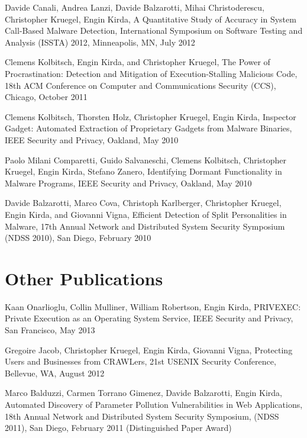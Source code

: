 \documentclass[letterpaper,11pt]{scrartcl}
\begin{document}
\vspace*{1em}
\noindent Davide Canali, Andrea Lanzi, Davide Balzarotti, Mihai Christoderescu,
Christopher Kruegel, Engin Kirda, A Quantitative Study of Accuracy in
System Call-Based Malware Detection, International Symposium on
Software Testing and Analysis (ISSTA) 2012, Minneapolis, MN, July 2012

\vspace*{1em}
\noindent Clemens Kolbitsch, Engin Kirda, and Christopher Kruegel, The Power of
Procrastination: Detection and Mitigation of Execution-Stalling
Malicious Code, 18th ACM Conference on Computer and Communications
Security (CCS), Chicago, October 2011

\vspace*{1em}
\noindent Clemens Kolbitsch, Thorsten Holz, Christopher Kruegel, Engin Kirda,
Inspector Gadget: Automated Extraction of Proprietary Gadgets from
Malware Binaries, IEEE Security and Privacy, Oakland, May 2010

\vspace*{1em}
\noindent Paolo Milani Comparetti, Guido Salvaneschi, Clemens Kolbitsch,
Christopher Kruegel, Engin Kirda, Stefano Zanero, Identifying Dormant
Functionality in Malware Programs, IEEE Security and Privacy, Oakland,
May 2010

\vspace*{1em}
\noindent Davide Balzarotti, Marco Cova, Christoph Karlberger, Christopher
Kruegel, Engin Kirda, and Giovanni Vigna, Efficient Detection of Split
Personalities in Malware, 17th Annual Network and Distributed System
Security Symposium (NDSS 2010), San Diego, February 2010

\section*{Other Publications}

\vspace*{1em}
\noindent Kaan Onarlioglu, Collin Mulliner, William Robertson, Engin
Kirda, PRIVEXEC: Private Execution as an Operating System Service,
IEEE Security and Privacy, San Francisco, May 2013

\vspace*{1em}
\noindent Gregoire Jacob, Christopher Kruegel, Engin Kirda, Giovanni
Vigna, Protecting Users and Businesses from CRAWLers, 21st USENIX
Security Conference, Bellevue, WA, August 2012

\vspace*{1em}
\noindent Marco Balduzzi, Carmen Torrano Gimenez, Davide Balzarotti, Engin
Kirda, Automated Discovery of Parameter Pollution Vulnerabilities in
Web Applications, 18th Annual Network and Distributed System Security
Symposium, (NDSS 2011), San Diego, February 2011 (Distinguished Paper
Award)
\end{document}
